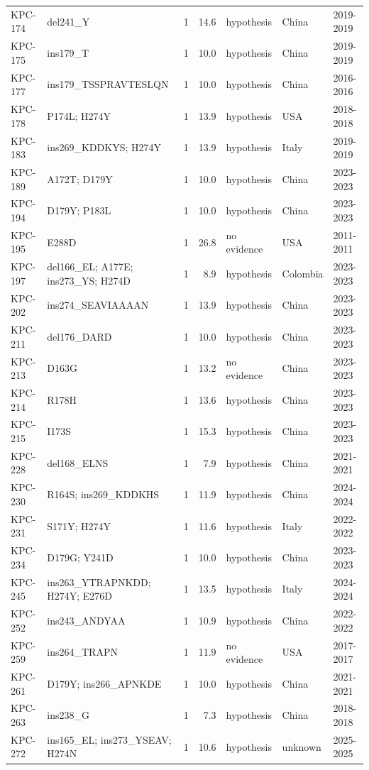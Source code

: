 \begin{longtable}{@{}l p{4.6cm} r r l l l@{}}
KPC-174 & del241\_Y & 1 & 14.6 & hypothesis & China & 2019-2019 \\
KPC-175 & ins179\_T & 1 & 10.0 & hypothesis & China & 2019-2019 \\
KPC-177 & ins179\_TSSPRAVTESLQN & 1 & 10.0 & hypothesis & China & 2016-2016 \\
KPC-178 & P174L; H274Y & 1 & 13.9 & hypothesis & USA & 2018-2018 \\
KPC-183 & ins269\_KDDKYS; H274Y & 1 & 13.9 & hypothesis & Italy & 2019-2019 \\
KPC-189 & A172T; D179Y & 1 & 10.0 & hypothesis & China & 2023-2023 \\
KPC-194 & D179Y; P183L & 1 & 10.0 & hypothesis & China & 2023-2023 \\
KPC-195 & E288D & 1 & 26.8 & no evidence & USA & 2011-2011 \\
KPC-197 & del166\_EL; A177E; ins273\_YS; H274D & 1 & 8.9 & hypothesis & Colombia & 2023-2023 \\
KPC-202 & ins274\_SEAVIAAAAN & 1 & 13.9 & hypothesis & China & 2023-2023 \\
KPC-211 & del176\_DARD & 1 & 10.0 & hypothesis & China & 2023-2023 \\
KPC-213 & D163G & 1 & 13.2 & no evidence & China & 2023-2023 \\
KPC-214 & R178H & 1 & 13.6 & hypothesis & China & 2023-2023 \\
KPC-215 & I173S & 1 & 15.3 & hypothesis & China & 2023-2023 \\
KPC-228 & del168\_ELNS & 1 & 7.9 & hypothesis & China & 2021-2021 \\
KPC-230 & R164S; ins269\_KDDKHS & 1 & 11.9 & hypothesis & China & 2024-2024 \\
KPC-231 & S171Y; H274Y & 1 & 11.6 & hypothesis & Italy & 2022-2022 \\
KPC-234 & D179G; Y241D & 1 & 10.0 & hypothesis & China & 2023-2023 \\
KPC-245 & ins263\_YTRAPNKDD; H274Y; E276D & 1 & 13.5 & hypothesis & Italy & 2024-2024 \\
KPC-252 & ins243\_ANDYAA & 1 & 10.9 & hypothesis & China & 2022-2022 \\
KPC-259 & ins264\_TRAPN & 1 & 11.9 & no evidence & USA & 2017-2017 \\
KPC-261 & D179Y; ins266\_APNKDE & 1 & 10.0 & hypothesis & China & 2021-2021 \\
KPC-263 & ins238\_G & 1 & 7.3 & hypothesis & China & 2018-2018 \\
KPC-272 & ins165\_EL; ins273\_YSEAV; H274N & 1 & 10.6 & hypothesis & unknown & 2025-2025 \\

\end{longtable}

